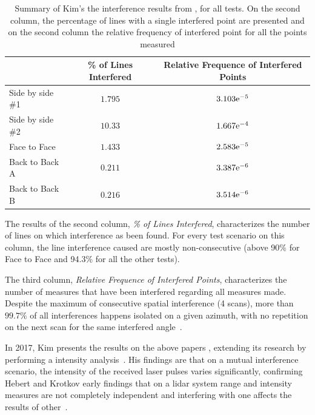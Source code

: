 \begin{table}[H]
	\centering
	\renewcommand{\arraystretch}{1.3}
		\begin{tabular}{@{}l|c|c@{}}
			                 & \% of Lines Interfered & Relative Frequence of Interfered Points \\ \midrule
			Side by side \#1 & $1.795$                & $3.103\mathrm{e}^{-5}$  \\
			Side by side \#2 & $10.33$                & $1.667\mathrm{e}^{-4}$ \\
			Face to Face     & $1.433$                & $2.583\mathrm{e}^{-5}$  \\
			Back to Back A   & $0.211$                & $3.387\mathrm{e}^{-6}$  \\
			Back to Back B   & $0.216$                & $3.514\mathrm{e}^{-6}$  \\ \bottomrule
		\end{tabular}%
		\caption{Summary of Kim's \etal the interference results from \cite{Kim2015b, Kim2015c}, for all tests. On the second column, the percentage of lines with a single interfered point are presented and on the second column the relative frequency of interfered point for all the points measured}
	\label{tab:kim_2015_results}
\end{table}

The results of the second column, \textit{\% of Lines Interfered}, characterizes the number of lines on which interference as been found. For every test scenario on this column, the line interference caused are mostly non-consecutive (above 90\% for Face to Face and 94.3\% for all the other tests).

The third column, \textit{Relative Frequence of Interfered Points}, characterizes the number of measures that have been interfered regarding all measures made. Despite the maximum of consecutive spatial interference (4 scans), more than $99.7\%$ of all interferences happens isolated on a given azimuth, with no repetition on the next scan for the same interfered angle~\cite{Kim2015c}.





In 2017, Kim \etal presents the results on the above papers \cite{Kim2015a, Kim2015b, Kim2015c}, extending its research by performing a intensity analysis~\cite{Kim2017}. His findings are that on a mutual interference scenario, the intensity of the received laser pulses varies significantly, confirming Hebert and Krotkov early findings that on a \ac{lidar} system range and intensity measures are not completely independent and interfering with one affects the results of other~\cite{Hebert}.

